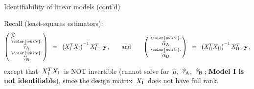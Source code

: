 \begin{frame}{\LARGE Identifiability of linear models (cont'd)}

\vskip -0.2cm



\vskip -0.3cm

Recall (least-squares estimators):\pause
{\scriptsize
\begin{equation*}
\left(\!\begin{array}{l}
	\widehat{\mu} \\
	\overset{{\color{white}.}}{\widehat{\tau}_{\textnormal{A}}} \\
	\overset{{\color{white}.}}{\widehat{\tau}_{\textnormal{B}}}
\end{array}\!\!\right)
\;\;=\;\;
\left(X_{\textnormal{I}}^{T}X_{\textnormal{I}}\right)^{-1}X_{\textnormal{I}}^{T}\cdot\mathbf{y}\,,
\quad\quad
\textnormal{and}
\quad\quad
\left(\!\begin{array}{l}
	\overset{{\color{white}.}}{\widehat{\alpha}_{\textnormal{A}}} \\
	\overset{{\color{white}.}}{\widehat{\alpha}_{\textnormal{B}}}
\end{array}\!\!\right)
\;\;=\;\;
\left(X_{\textnormal{II}}^{T}X_{\textnormal{II}}\right)^{-1}X_{\textnormal{II}}^{T}\cdot\mathbf{y}\,,
\end{equation*}
}\pause
except that \pause\,$X_{\textnormal{I}}^{T}X_{\textnormal{I}}$\, is NOT invertible
\pause(cannot solve for\, $\widehat{\mu}$,\, $\widehat{\tau}_{\textnormal{A}}$,\, $\widehat{\tau}_{\textnormal{B}}$\,;
\pause \textbf{Model I is not identifiable}),
\pause
since the design matrix \,$X_{\textnormal{I}}$\, does not have full rank.

\end{frame}
\normalsize


